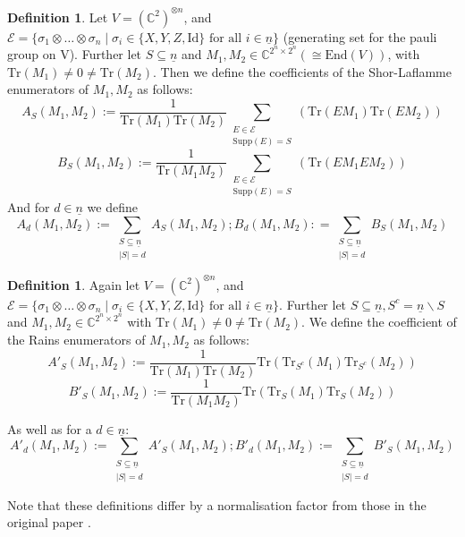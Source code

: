 \documentclass{article}
\def\C{\mathbb{C}}
\def\supp{\text{Supp}}
\def\n{\underline{n}}
\def\fa{\text{ for all }}
\def\Tr{\text{Tr}}
\def\Id{\text{Id}}
\theoremstyle{definition}
\newtheorem{defn}[Satz]{Definition}
\begin{document}
\begin{defn}\label{shorLaflamme}
Let $V = (\C^2)^{\otimes n}$, and $\mathcal{E} = \{ \sigma_1 \otimes \ldots \otimes \sigma_n \mid \sigma_i \in \{X,Y,Z,\Id \} \fa i \in \underline{n} \}$ (generating set for the pauli group on V). Further let $S \subseteq \underline{n}$ and $M_1, M_2 \in \C^{2^n \times 2^n} (\cong \text{End}(V))$, with $\Tr(M_1) \neq 0 \neq \Tr(M_2)$.
Then we define the coefficients of the Shor-Laflamme enumerators \cite{shor-Laflamme} of $M_1, M_2$ as follows:
\begin{equation} A_S(M_1,M_2) := \frac{1}{\Tr(M_1)\Tr(M_2)}\sum_{\substack{E \in \mathcal{E} \\ \supp(E) = S}}(\Tr(E M_1)\Tr(E M_2)) \end{equation}
\begin{equation} B_S(M_1,M_2) := \frac{1}{\Tr(M_1 M_2)} \sum_{\substack{E \in \mathcal{E} \\ \supp(E) = S}}(\Tr(E M_1 E M_2)) \end{equation}
And for $d \in \underline{n}$ we define
\begin{equation} A_d(M_1,M_2) := \sum_{\substack{ S \subseteq \underline{n} \\ |S| = d}} A_S(M_1,M_2) ; B_d(M_1,M_2): = \sum_{\substack{ S \subseteq \underline{n} \\ |S| = d}} B_S(M_1,M_2) \end{equation}
\end{defn}


\begin{defn}\label{rains}
Again let $V = (\C^2)^{\otimes n}$, and $\mathcal{E} = \{ \sigma_1 \otimes \ldots \otimes \sigma_n \mid \sigma_i \in \{X,Y,Z,\Id \} \fa i \in \underline{n} \}$. Further let $S \subseteq \underline{n}, S^c = \n \backslash S$ and $M_1, M_2 \in \C^{2^n \times 2^n}$ with $\Tr(M_1) \neq 0 \neq \Tr(M_2)$.
We define the coefficient of the Rains enumerators \cite{rains} of $M_1,M_2$ as follows:
\begin{equation}A'_S(M_1,M_2) := \frac{1}{\Tr(M_1)\Tr(M_2)} \Tr(\Tr_{S^c}(M_1)\Tr_{S^c}(M_2)) \end{equation}
\begin{equation}B'_S(M_1,M_2) := \frac{1}{\Tr(M_1 M_2)} \Tr(\Tr_S(M_1)\Tr_S(M_2)) \end{equation}

As well as for a $d \in \n$: 
\begin{equation} A'_d(M_1,M_2) := \sum_{\substack{ S \subseteq \underline{n} \\ |S| = d}} A'_S(M_1,M_2) ; B'_d(M_1,M_2) := \sum_{\substack{ S \subseteq \underline{n} \\ |S| = d}} B'_S(M_1,M_2) \end{equation}
\end{defn}
Note that these definitions differ by a normalisation factor from those in the original paper \cite{rains}.
\end{document}
